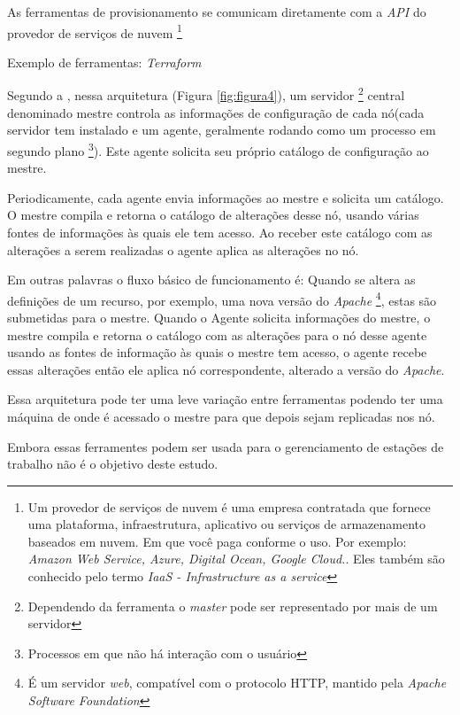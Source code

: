 As ferramentas de provisionamento se comunicam diretamente com a \textit{API} do provedor de serviços de nuvem \footnote{Um provedor de serviços de nuvem é uma empresa contratada que fornece uma plataforma, infraestrutura, aplicativo ou serviços de armazenamento baseados em nuvem. Em que você paga conforme o uso. Por exemplo: \textit{Amazon Web Service, Azure, Digital Ocean, Google Cloud.}. Eles também são conhecido pelo termo \textit{IaaS - Infrastructure as a service} }

Exemplo de ferramentas: \textit{Terraform}

 \label{cliente-servidor}
 
 Segundo a , nessa arquitetura (Figura \ref{fig:figura4}), um servidor \footnote{Dependendo da ferramenta o \textit{master} pode ser representado por mais de um servidor} central denominado mestre controla as informações de configuração de cada nó(cada servidor tem instalado e um agente, geralmente rodando como um processo em segundo plano \footnote{Processos em que não há interação com o usuário}). Este agente solicita seu próprio catálogo de configuração ao mestre.  
 
 Periodicamente, cada agente envia informações ao mestre e solicita um catálogo. O mestre compila e retorna o catálogo de alterações desse nó, usando várias fontes de informações às quais ele tem acesso. Ao receber este catálogo com as alterações a serem realizadas o agente aplica as alterações no nó. 
 
 Em outras palavras o fluxo básico de funcionamento é: Quando se altera as definições de um recurso, por exemplo, uma nova versão do \textit{Apache} \footnote{É um servidor \textit{web}, compatível com o protocolo HTTP, mantido pela \textit{Apache Software Foundation }}, estas são submetidas para o mestre. Quando o Agente solicita informações do mestre, o mestre compila e retorna o catálogo com as alterações para o nó desse agente usando as fontes de informação às quais o mestre tem acesso, o agente recebe essas alterações então ele aplica nó correspondente, alterado a versão do \textit{Apache}.   

Essa arquitetura pode ter uma leve variação entre ferramentas podendo ter uma máquina de onde é acessado o mestre para que depois sejam replicadas nos nó.

Embora essas ferramentes podem ser usada para o gerenciamento de estações de trabalho não é o objetivo deste estudo.

